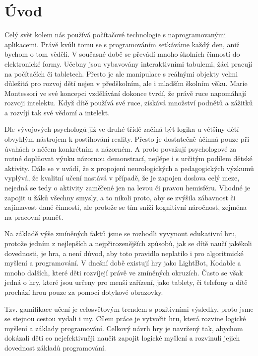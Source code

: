 \chapter{Úvod}

Celý svět kolem nás používá počítačové technologie s naprogramovanými aplikacemi. Právě kvůli tomu se s programováním setkáváme každý den, aniž bychom o tom věděli. V současné době se převádí mnoho školních činností do elektronické formy. Učebny jsou vybavovány interaktivními tabulemi, žáci pracují na počítačích či tabletech. Přesto je ale manipulace s reálnými objekty velmi důležitá pro rozvoj dětí nejen v předškolním, ale i mladším školním věku. Marie Montessori ve své koncepci vzdělávání dokonce tvrdí, že právě ruce napomáhají rozvoji intelektu. Když dítě používá své ruce, získává množství podnětů a zážitků a rozvíjí tak své vědomí a intelekt.\cite{Montessori}
\par
Dle vývojových psychologů\cite{VyvojovaPsychologie} již ve druhé třídě začíná být logika u většiny dětí obvyklým nástrojem k postihování reality. Přesto je dostatečně účinná pouze při úvahách o něčem konkrétním a názorném. A proto považují psychologové za nutné doplňovat výuku názornou demonstrací, nejlépe i s určitým podílem dětské aktivity. Dále se v \cite{ASE} uvádí, že z propojení neurologických a pedagogických výzkumů vyplývá, že kvalitní učení nastává v případě, že je zapojen doslova celý meze, nejedná se tedy o aktivity zaměřené jen na levou či pravou hemisféru. Vhodné je zapojit u žáků všechny smysly, a to nikoli proto, aby se zvýšila zábavnost či zajímavost dané činnosti, ale protože se tím sníží kognitivní náročnost, zejména na pracovní paměť.
\par
Na základě výše zmíněných faktů jsme se rozhodli vyvynout edukativní hru, protože jedním z nejlepších a nejpřirozenějších způsobů, jak se dítě naučí jakékoli dovednosti, je hra, a není důvod, aby toto pravidlo neplatilo i pro algoritmické myšlení a programování. V dnešní době existují hry jako LightBot, Kodable a mnoho dalších, které děti rozvíjejí právě ve zmíněných okruzích. Často se však jedná o hry, které jsou určeny pro menší zařízení, jako tablety, či telefony a dítě prochází hrou pouze za pomocí dotykové obrazovky.
\par
Tzv. gamifikace učení je celosvětovým trendem s pozitivními výsledky, proto jsme se stejnou cestou vydali i my. Cílem práce je vytvořit hru, která rozvine logické myšlení a základy programování. Celkový návrh hry je navržený tak, abychom dokázali děti co nejefektivněji naučit zapojit logické myšlení a rozvinuli jejich dovednost základů programování.